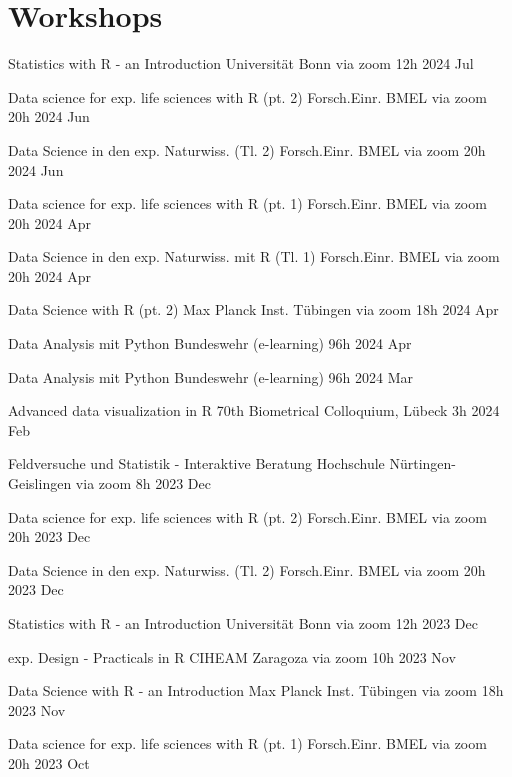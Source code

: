 \documentclass[11pt,a4paper,]{awesome-cv}
\begin{document}
\newpage

\hypertarget{workshops}{%
\section{Workshops}\label{workshops}}

\begin{cvhonors} 
\cvhonor
{Statistics with R - an Introduction  }
{Universität Bonn via zoom}
{12h}
{2024 Jul  }

\cvhonor
{Data science for exp. life sciences with R (pt. 2)  }
{Forsch.Einr. BMEL via zoom}
{20h}
{2024 Jun  }

\cvhonor
{Data Science in den exp. Naturwiss. (Tl. 2)  }
{Forsch.Einr. BMEL via zoom}
{20h}
{2024 Jun  }

\cvhonor
{Data science for exp. life sciences with R (pt. 1)  }
{Forsch.Einr. BMEL via zoom}
{20h}
{2024 Apr  }

\cvhonor
{Data Science in den exp. Naturwiss. mit R (Tl. 1)  }
{Forsch.Einr. BMEL via zoom}
{20h}
{2024 Apr  }

\cvhonor
{Data Science with R (pt. 2)  }
{Max Planck Inst. Tübingen via zoom}
{18h}
{2024 Apr  }

\cvhonor
{Data Analysis mit Python  }
{Bundeswehr (e-learning)}
{96h}
{2024 Apr  }

\cvhonor
{Data Analysis mit Python  }
{Bundeswehr (e-learning)}
{96h}
{2024 Mar  }

\cvhonor
{Advanced data visualization in R  }
{70th Biometrical Colloquium, Lübeck}
{3h}
{2024 Feb  }

\cvhonor
{Feldversuche und Statistik - Interaktive Beratung  }
{Hochschule Nürtingen-Geislingen via zoom}
{8h}
{2023 Dec  }

\cvhonor
{Data science for exp. life sciences with R (pt. 2)  }
{Forsch.Einr. BMEL via zoom}
{20h}
{2023 Dec  }

\cvhonor
{Data Science in den exp. Naturwiss. (Tl. 2)  }
{Forsch.Einr. BMEL via zoom}
{20h}
{2023 Dec  }

\cvhonor
{Statistics with R - an Introduction  }
{Universität Bonn via zoom}
{12h}
{2023 Dec  }

\cvhonor
{exp. Design - Practicals in R  }
{CIHEAM Zaragoza via zoom}
{10h}
{2023 Nov  }

\cvhonor
{Data Science with R - an Introduction  }
{Max Planck Inst. Tübingen via zoom}
{18h}
{2023 Nov  }

\cvhonor
{Data science for exp. life sciences with R (pt. 1)  }
{Forsch.Einr. BMEL via zoom}
{20h}
{2023 Oct  }


\end{cvhonors}
\end{document}
